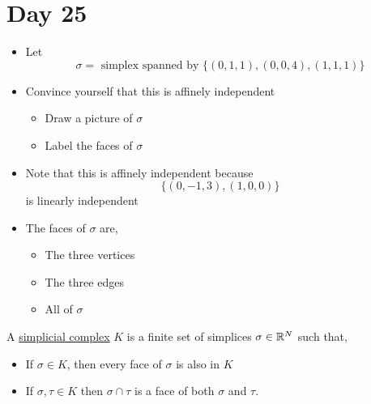 \documentclass[../notes.tex]{subfiles}
\begin{document}
\section{Day 25}
\begin{itemize}
    \item Let
        \[
            \sigma = \text{ simplex spanned by }\{(0,1,1),(0,0,4),(1,1,1)\}
        \]
    \item Convince yourself that this is affinely independent
        \begin{itemize}
            \item Draw a picture of $\sigma$\\
        \begin{center}
        \end{center}
            \item Label the faces of $\sigma$
        \end{itemize}
    \item Note that this is affinely independent because
        \[
            \{(0,-1,3),(1,0,0)\}
        \]
        is linearly independent
    \item The faces of $\sigma$ are,
        \begin{itemize}
            \item The three vertices
            \item The three edges
            \item All of $\sigma$
        \end{itemize}
\end{itemize}
\begin{definition}
    A \underline{simplicial complex} $K$ is a finite set of simplices 
    $\sigma\in \mathbb{R}^N$ such that,
    \begin{itemize}
        \item If $\sigma\in K$, then every face of $\sigma$ is also in $K$
        \item If $\sigma, \tau\in K$ then $\sigma\cap \tau$ is
            a face of both $\sigma$ and $\tau$.
    \end{itemize}
\end{definition}
\end{document}
